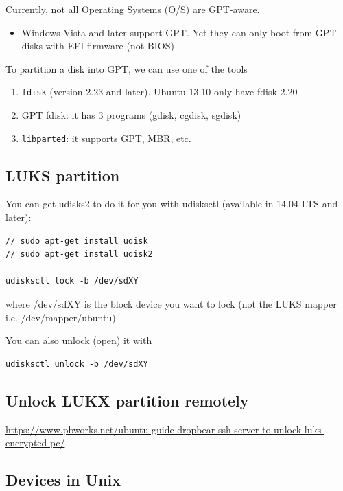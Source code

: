 Currently, not all Operating Systems (O/S) are GPT-aware. 
\begin{itemize}
  \item Windows Vista and later support GPT. Yet they can only boot from GPT
  disks with EFI firmware (not BIOS)
\end{itemize}


To partition a disk into GPT, we can use one of the tools
\begin{enumerate}
  \item \verb!fdisk! (version 2.23 and later). Ubuntu 13.10 only have fdisk 2.20
  \item GPT fdisk: it has 3 programs (gdisk, cgdisk, sgdisk)
  \item \verb!libparted!: it supports GPT, MBR, etc. 
\end{enumerate}



\subsection{LUKS partition}
\label{sec:partition-LUKS}

You can get udisks2 to do it for you with udisksctl (available in 14.04 LTS and later):
\begin{verbatim}
// sudo apt-get install udisk
// sudo apt-get install udisk2

udisksctl lock -b /dev/sdXY
\end{verbatim}
where /dev/sdXY is the block device you want to lock (not the LUKS mapper i.e. /dev/mapper/ubuntu)

You can also unlock (open) it with
\begin{verbatim}
udisksctl unlock -b /dev/sdXY
\end{verbatim}

\subsection{Unlock LUKX partition remotely}

\url{https://www.pbworks.net/ubuntu-guide-dropbear-ssh-server-to-unlock-luks-encrypted-pc/}

\subsection{Devices in Unix}

